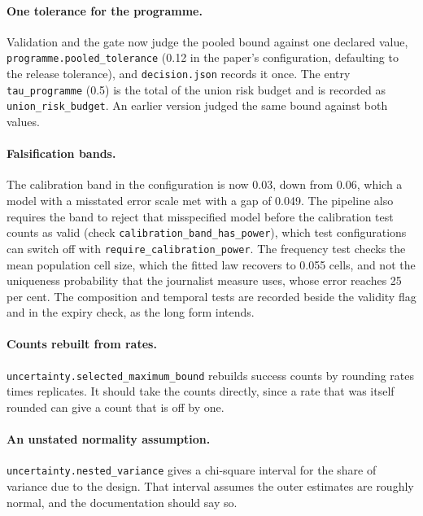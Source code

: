 \paragraph{One tolerance for the programme.} Validation and the gate now judge the pooled
bound against one declared value, \texttt{programme.\allowbreak{}pooled\_\allowbreak{}tolerance}
(0.12 in the paper's configuration, defaulting to the release tolerance), and
\texttt{decision.\allowbreak{}json} records it once. The entry
\texttt{tau\_\allowbreak{}programme} (0.5) is the total of the union risk budget and is recorded
as \texttt{union\_\allowbreak{}risk\_\allowbreak{}budget}. An earlier version judged the same bound
against both values. %

\paragraph{Falsification bands.} The calibration band in the configuration is now 0.03,
down from 0.06, which a model with a misstated error scale met with a gap of 0.049. The
pipeline also requires the band to reject that misspecified model before the calibration
test counts as valid (check \texttt{calibration\_\allowbreak{}band\_\allowbreak{}has\_\allowbreak{}power}),
which test configurations can switch off with \texttt{require\_\allowbreak{}calibration\_\allowbreak{}power}. The
frequency test checks the mean population cell size, which the fitted law recovers to
0.055 cells, and not the uniqueness probability that the journalist measure uses, whose
error reaches 25 per cent. %
The composition and temporal tests are recorded beside the validity flag and in the
expiry check, as the long form intends.

\paragraph{Counts rebuilt from rates.} \texttt{uncertainty.\allowbreak{}selected\_\allowbreak{}maximum\_\allowbreak{}bound}
rebuilds success counts by rounding rates times replicates. It should take the counts
directly, since a rate that was itself rounded can give a count that is off by one.

\paragraph{An unstated normality assumption.} \texttt{uncertainty.\allowbreak{}nested\_\allowbreak{}variance}
gives a chi-square interval for the share of variance due to the design. That interval
assumes the outer estimates are roughly normal, and the documentation should say so.

